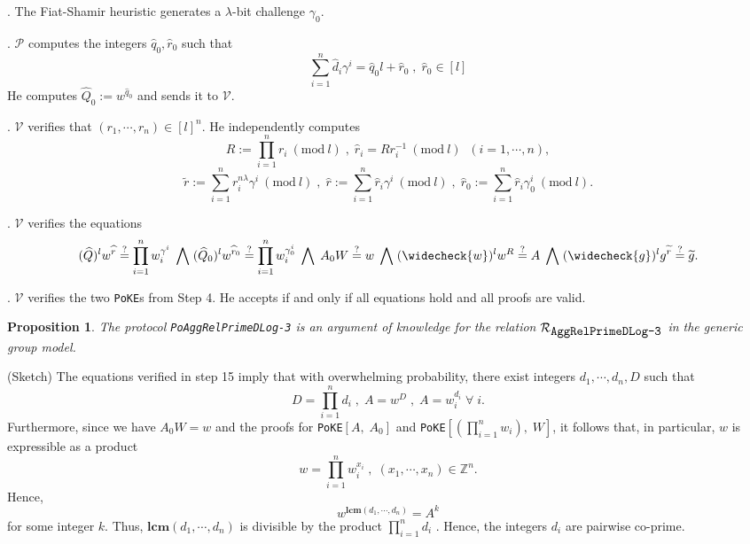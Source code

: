 \documentclass[11pt, lettersize, notitlepage, leqno, footskip=0.6cm]{article}
\newcommand{\bz}{\mathbb Z}
\newcommand{\pl}{\prod\limits}
\newcommand{\slim}{\sum\limits}
\newcommand{\wti}{\widetilde}
\newcommand{\mc}{\mathcal}
\newcommand{\mbf}{\mathbf}
\newcommand{\lam}{\lambda}
\newcommand{\what}{\widehat}
\newcommand{\weck}{\widecheck}
\newcommand{\mP}{\mc{P}}
\newcommand{\V}{\mc{V}}
\newcommand{\vs}{\vspace{-0.15cm}}
\newcommand{\noin}{\noindent}
\newcommand{\op}{overwhelming probability}
\newcommand{\sta}{\stackrel{?}{=}}
\newcommand{\Mod}[1]{\ (\mathrm{mod}\ #1)}
\newcommand{\LCM}{\mbf{lcm}}
\newtheorem{Prop}[Thm]{Proposition}
\numberwithin{equation}{section}
\begin{document}
\begin{prf1}
\noin 12. The Fiat-Shamir heuristic generates a $\lam$-bit challenge $\gamma_0$.

\noin 13. $\mP$ computes the integers $\what{q}_0, \what{r}_0$ such that \vs $$\slim_{i=1}^n \what{d}_i\gamma^i = \what{q}_0l+\what{r}_0\;,\;\what{r}_0\in [l]$$ He computes $\what{Q}_0:= w^{\what{q}_0} $ and sends it to $\V$.

\noin 14. $\V$ verifies that $(r_1,\cdots,r_n)\in [l]^{n}$. He independently computes \vs $$R:= \pl_{i=1}^n r_i\Mod{l} \;,\;\what{r}_i = Rr_i^{-1}\Mod{l}\;\;(i=1,\cdots,n),$$\vs $$\wti{r}:= \slim_{i=1}^n {r}_i^{n\lam}\gamma^i\Mod{l} \;,\; \what{r}:= \slim_{i=1}^n \what{r}_i\gamma^i\Mod{l}\;,\;\what{r}_0:= \slim_{i=1}^n \what{r}_i\gamma_0^i\Mod{l}.$$

\noin 15. $\V$ verifies the equations \vs $$(\what{Q})^lw^{\what{r}}\sta \pl_{i=1}^n w_i^{\gamma^i} \;\bigwedge\; (\what{Q}_0)^lw^{\what{r}_0}\sta \pl_{i=1}^n w_i^{\gamma_0^i}\;\bigwedge\; A_0W\sta w\;\bigwedge\; (\weck{w})^lw^R\sta A\;\bigwedge\; (\weck{g})^lg^{\wti{r}}\sta\wti{g}.$$

\noin 16. $\V$ verifies the two \verb|PoKE|s from Step 4. He accepts if and only if all equations hold and all proofs are valid.\end{prf1}

\vspace{0.1cm}


\begin{Prop} The protocol \verb|PoAggRelPrimeDLog-3| is an argument of knowledge for the relation $\mc{R}_{{\protect\verb|AggRelPrimeDLog-3|}}$ in the generic group model.\end{Prop}

\begin{prf} (Sketch) The equations verified in step 15 imply that with \op, there exist integers $d_1,\cdots,d_n, D$ such that \vs $$D = \pl_{i=1}^n d_i\;,\;A = w^D\;,\; A= w_i^{d_i}\;\forall \;i .$$ Furthermore, since we have $A_0W = w$ and the proofs for \verb|PoKE|$[A,\;A_0]$ and \verb|PoKE|$[(\pl_{i=1}^n w_i),\; W]$, it follows that, in particular, $w$ is expressible as a product \vs $$w =\pl_{i=1}^n w_i^{x_i}\;,\;(x_1,\cdots,x_n)\in\bz^n.$$ Hence, \vs $$w^{\LCM(d_1,\cdots,d_n)} = A^k$$ for some integer $k$. Thus, $\LCM(d_1,\cdots,d_n)$ is divisible by the product $\pl_{i=1}^n d_i$ . Hence, the integers $d_i$ are pairwise co-prime.\end{prf}



\bigskip
\end{document}
